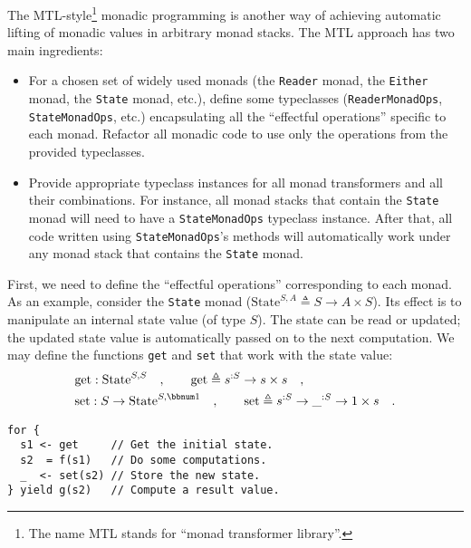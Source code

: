 The MTL-style\footnote{The name MTL stands for \textsf{``}monad transformer library\textsf{''}.}
monadic programming is another way
of achieving automatic lifting of monadic values in arbitrary monad
stacks. The MTL approach has two main ingredients:
\begin{itemize}
\item For a chosen set of widely used monads (the \lstinline!Reader! monad,
the \lstinline!Either! monad, the \lstinline!State! monad, etc.),
define some typeclasses (\lstinline!ReaderMonadOps!, \lstinline!StateMonadOps!,
etc.) encapsulating all the \textsf{``}effectful operations\textsf{''} specific to
each monad. Refactor all monadic code to use only the operations from
the provided typeclasses. 
\item Provide appropriate typeclass instances for all monad transformers
and all their combinations. For instance, all monad stacks that contain
the \lstinline!State! monad will need to have a \lstinline!StateMonadOps!
typeclass instance. After that, all code written using \lstinline!StateMonadOps!\textsf{'}s
methods will automatically work under any monad stack that contains
the \lstinline!State! monad. 
\end{itemize}
First, we need to define the \textsf{``}effectful operations\textsf{''} corresponding
to each monad. As an example, consider the \lstinline!State! monad
($\text{State}^{S,A}\triangleq S\rightarrow A\times S$). Its effect
is to manipulate an internal state value (of type $S$). The state
can be read or updated; the updated state value is automatically passed
on to the next computation. We may define the functions \lstinline!get!
and \lstinline!set! that work with the state value:
\begin{align*}
 & \text{get}:\text{State}^{S,S}\quad,\quad\quad\text{get}\triangleq s^{:S}\rightarrow s\times s\quad,\\
 & \text{set}:S\rightarrow\text{State}^{S,\bbnum 1}\quad,\quad\quad\text{set}\triangleq s^{:S}\rightarrow\_^{:S}\rightarrow1\times s\quad.
\end{align*}

\begin{lstlisting}
for {
  s1 <- get     // Get the initial state.
  s2  = f(s1)   // Do some computations.
  _  <- set(s2) // Store the new state.
} yield g(s2)   // Compute a result value.
\end{lstlisting}

